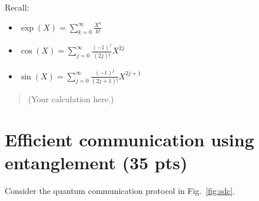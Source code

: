 \documentclass[a4paper,10pt,reqno,nonamelimits]{article}
\begin{document}
Recall:
\begin{itemize}
\item $\exp(X) = \sum_{k=0}^\infty \frac{X^k}{k!}$
\item $\cos(X) = \sum_{j=0}^\infty \frac{(-1)^j}{(2j)!} X^{2j}$
\item $\sin(X) = \sum_{j=0}^\infty \frac{(-1)^j}{(2j+1)!} X^{2j+1}$
\end{itemize}

\begin{quotation}\color{blue}
  (Your calculation here.)
\end{quotation}

\section{Efficient communication using entanglement (35 pts)}
Consider the quantum communication protocol in Fig.~\ref{fig:sdc}.
\end{document}
